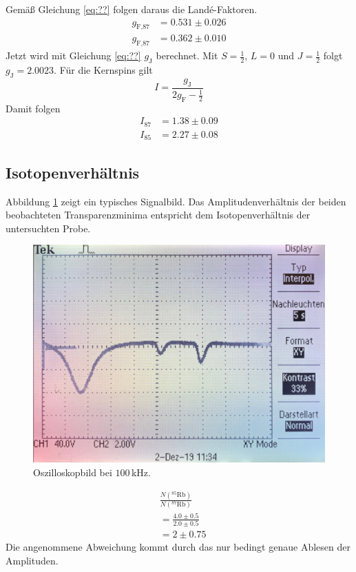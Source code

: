 \FloatBarrier
Gemäß Gleichung \ref{eq:??}%
folgen daraus die Landé-Faktoren.
\begin{align*}
  g_{\text{F,87}} &= 0.531\pm0.026\\
  g_{\text{F,87}} &= 0.362\pm0.010
\end{align*}
Jetzt wird mit Gleichung \ref{eq:??} %
$g_\text{J}$ berechnet.
Mit $S=\frac{1}{2}$, $L=0$ und $J=\frac{1}{2}$ folgt $g_\text{J} = 2.0023$.
Für die Kernspins gilt
\begin{equation}
  I = \frac{g_\text{J}}{2g_\text{F}-\frac{1}{2}}
\end{equation}
Damit folgen
\begin{align*}
  I_{87} &= 1.38\pm0.09 \\
  I_{85} &= 2.27\pm0.08
\end{align*}

\subsection{Isotopenverhältnis}
Abbildung \ref{fig:signal} zeigt ein typisches Signalbild.
Das Amplitudenverhältnis der beiden beobachteten Transparenzminima entspricht dem Isotopenverhältnis der untersuchten Probe.
\begin{figure}
  \centering
  \includegraphics[width=\textwidth]{data/Signal.jpg}
  \caption{Oszilloskopbild bei $100\,$kHz.}
  \label{fig:signal}
\end{figure}
\FloatBarrier
\begin{align*}
  &\frac{N\left(^{85}\text{Rb}\right)}{N\left(^{87}\text{Rb}\right)}\\
  &=\frac{4.0\pm0.5}{2.0\pm0.5}\\
  &=2\pm0.75
\end{align*}
Die angenommene Abweichung kommt durch das nur bedingt genaue Ablesen der Amplituden.


